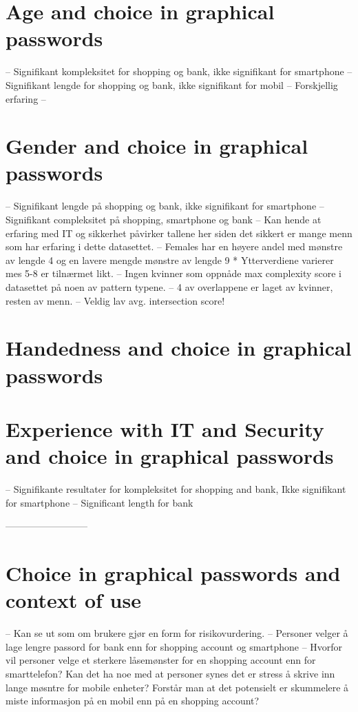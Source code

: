 
  \section{Age and choice in graphical passwords}
        -- Signifikant kompleksitet for shopping og bank, ikke signifikant for smartphone
        -- Signifikant lengde for shopping og bank, ikke signifikant for mobil
        -- Forskjellig erfaring
        -- 

    \section{Gender and choice in graphical passwords}
        -- Signifikant lengde på shopping og bank, ikke signifikant for smartphone
        -- Signifikant compleksitet på shopping, smartphone og bank
        -- Kan hende at erfaring med IT og sikkerhet påvirker tallene her siden det sikkert er mange menn som har erfaring i dette datasettet.
        -- Females har en høyere andel med mønstre av lengde 4 og en lavere mengde mønstre av lengde 9
            * Ytterverdiene varierer mes 5-8 er tilnærmet likt.
        -- Ingen kvinner som oppnåde max complexity score i datasettet på noen av pattern typene. 
        -- 4 av overlappene er laget av kvinner, resten av menn. 
        -- Veldig lav avg. intersection score!

    \section{Handedness and choice in graphical passwords}
        

    \section{Experience with IT and Security and choice in graphical passwords}
        -- Signifikante resultater for kompleksitet for shopping and bank, Ikke signifikant for smartphone
        -- Significant length for bank


--------------------------



    \section{Choice in graphical passwords and context of use}
        -- Kan se ut som om brukere gjør en form for risikovurdering.
        -- Personer velger å lage lengre passord for bank enn for shopping account og smartphone
        -- Hvorfor vil personer velge et sterkere låsemønster for en shopping account enn for smarttelefon? 
             Kan det ha noe med at personer synes det er stress å skrive inn lange møsntre for mobile enheter?
             Forstår man at det potensielt er skummelere å miste informasjon på en mobil enn på en shopping account?

